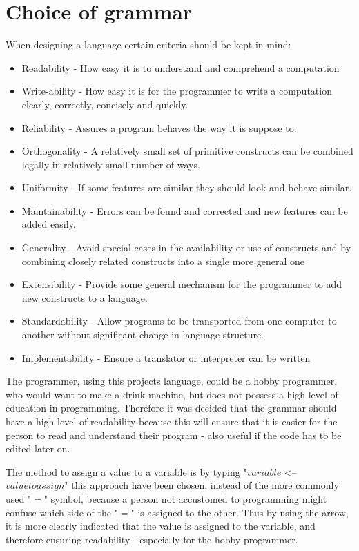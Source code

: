\section{Choice of grammar}
When designing a language certain criteria should be kept in mind:
\begin{itemize}
\item Readability
- How easy it is to understand and comprehend a computation
\item Write-ability
- How easy it is for the programmer to write a computation clearly, correctly, concisely and quickly. 
\item Reliability
- Assures a program behaves the way it is suppose to.
\item Orthogonality
- A relatively small set of primitive constructs can be combined legally in relatively small number of ways.
\item Uniformity
- If some features are similar they should look and behave similar.
\item Maintainability
- Errors can be found and corrected and new features can be added easily.
\item Generality
- Avoid special cases in the availability or use of constructs and by combining closely related constructs into a single more general one	
\item Extensibility
- Provide some general mechanism for the programmer to add new constructs to a language.
\item Standardability
- Allow programs to be transported from one computer to another without significant change in language structure.
\item Implementability
- Ensure a translator or interpreter can be written
\end{itemize}

The programmer, using this projects language, could be a hobby programmer, who would want to make a drink machine, but does not possess a high level of education in programming. Therefore it was decided that the grammar should have a high level of readability because this will ensure that it is easier for the person to read and understand their program - also useful if the code has to be edited later on.


The method to assign a value to a variable is by typing "$variable$ <-- $value to assign$" this approach have been chosen, instead of the more commonly used "$=$" symbol, because a person not accustomed to programming might confuse which side of the "$=$" is assigned to the other. Thus by using the arrow, it is more clearly indicated that the value is assigned to the variable, and therefore ensuring readability - especially for the hobby programmer.

